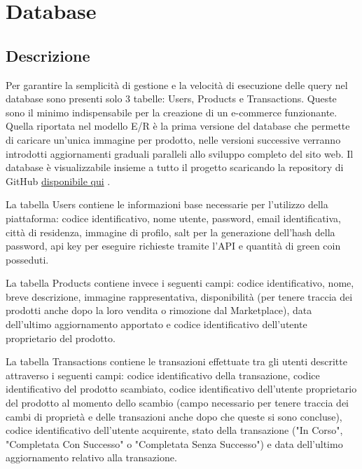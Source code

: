 \section{Database}
\subsection{Descrizione}
Per garantire la semplicità di gestione e la velocità di esecuzione delle query nel database sono presenti solo 3 tabelle: Users, Products e Transactions. Queste sono il minimo indispensabile per la creazione di un e-commerce funzionante. Quella riportata nel modello E/R è la prima versione del database che permette di caricare un'unica immagine per prodotto, nelle versioni successive verranno introdotti aggiornamenti graduali paralleli allo sviluppo completo del sito web. Il database è visualizzabile insieme a tutto il progetto scaricando la repository di GitHub \href{https://github.com/MauroPello/elaborato}{disponibile qui} \cite{GitHub}. 
\medskip

La tabella Users contiene le informazioni base necessarie per l'utilizzo della piattaforma: codice identificativo, nome utente, password, email identificativa, città di residenza, immagine di profilo, salt per la generazione dell'hash della password, api key per eseguire richieste tramite l'API e quantità di green coin posseduti. 
\medskip

La tabella Products contiene invece i seguenti campi: codice identificativo, nome, breve descrizione, immagine rappresentativa, disponibilità (per tenere traccia dei prodotti anche dopo la loro vendita o rimozione dal Marketplace), data dell'ultimo aggiornamento apportato e codice identificativo dell'utente proprietario del prodotto. 
\medskip

La tabella Transactions contiene le transazioni effettuate tra gli utenti descritte attraverso i seguenti campi: codice identificativo della transazione, codice identificativo del prodotto scambiato, codice identificativo dell'utente proprietario del prodotto al momento dello scambio (campo necessario per tenere traccia dei cambi di proprietà e delle transazioni anche dopo che queste si sono concluse), codice identificativo dell'utente acquirente, stato della transazione ("In Corso", "Completata Con Successo" o "Completata Senza Successo") e data dell'ultimo aggiornamento relativo alla transazione. 
